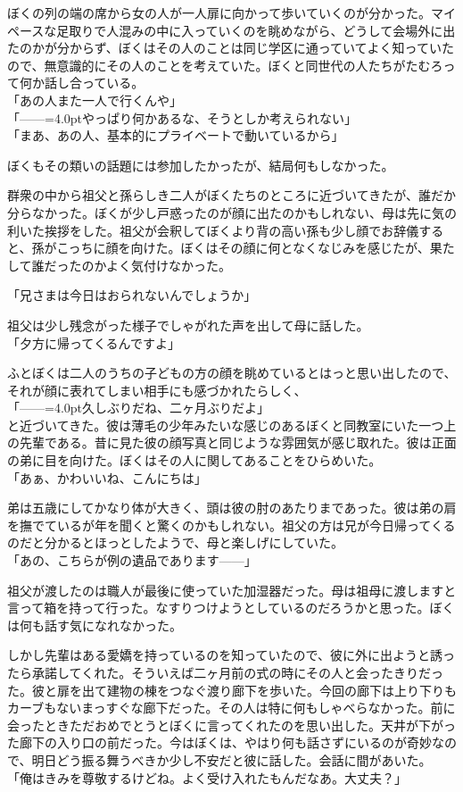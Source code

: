 \documentclass[b5j,twoside,twocolumn]{utarticle}
\begin{document}
ぼくの列の端の席から女の人が一人扉に向かって歩いていくのが分かった。マイペースな足取りで人混みの中に入っていくのを眺めながら、どうして会場外に出たのかが分からず、ぼくはその人のことは同じ学区に通っていてよく知っていたので、無意識的にその人のことを考えていた。ぼくと同世代の人たちがたむろって何か話し合っている。\\
「あの人また一人で行くんや」\\
「\tbaselineshift=2.5pt------\tbaselineshift=4.0ptやっぱり何かあるな、そうとしか考えられない」\\
「まあ、あの人、基本的にプライベートで動いているから」


ぼくもその類いの話題には参加したかったが、結局何もしなかった。


群衆の中から祖父と孫らしき二人がぼくたちのところに近づいてきたが、誰だか分らなかった。ぼくが少し戸惑ったのが顔に出たのかもしれない、母は先に気の利いた挨拶をした。祖父が会釈してぼくより背の高い孫も少し顔でお辞儀すると、孫がこっちに顔を向けた。ぼくはその顔に何となくなじみを感じたが、果たして誰だったのかよく気付けなかった。


「兄さまは今日はおられないんでしょうか」


祖父は少し残念がった様子でしゃがれた声を出して母に話した。\\
「夕方に帰ってくるんですよ」


ふとぼくは二人のうちの子どもの方の顔を眺めているとはっと思い出したので、それが顔に表れてしまい相手にも感づかれたらしく、\\
「\tbaselineshift=2.5pt------\tbaselineshift=4.0pt久しぶりだね、二ヶ月ぶりだよ」\\
と近づいてきた。彼は薄毛の少年みたいな感じのあるぼくと同教室にいた一つ上の先輩である。昔に見た彼の顔写真と同じような雰囲気が感じ取れた。彼は正面の弟に目を向けた。ぼくはその人に関してあることをひらめいた。\\
「あぁ、かわいいね、こんにちは」


弟は五歳にしてかなり体が大きく、頭は彼の肘のあたりまであった。彼は弟の肩を撫でているが年を聞くと驚くのかもしれない。祖父の方は兄が今日帰ってくるのだと分かるとほっとしたようで、母と楽しげにしていた。\\
「あの、こちらが例の遺品であります\tbaselineshift=2.5pt------\tbaselineshift=4.0pt」


祖父が渡したのは職人が最後に使っていた加湿器だった。母は祖母に渡しますと言って箱を持って行った。なすりつけようとしているのだろうかと思った。ぼくは何も話す気になれなかった。


しかし先輩はある愛嬌を持っているのを知っていたので、彼に外に出ようと誘ったら承諾してくれた。そういえば二ヶ月前の式の時にその人と会ったきりだった。彼と扉を出て建物の棟をつなぐ渡り廊下を歩いた。今回の廊下は上り下りもカーブもないまっすぐな廊下だった。その人は特に何もしゃべらなかった。前に会ったときただおめでとうとぼくに言ってくれたのを思い出した。天井が下がった廊下の入り口の前だった。今はぼくは、やはり何も話さずにいるのが奇妙なので、明日どう振る舞うべきか少し不安だと彼に話した。会話に間があいた。\\
「俺はきみを尊敬するけどね。よく受け入れたもんだなあ。大丈夫？」
\end{document}

